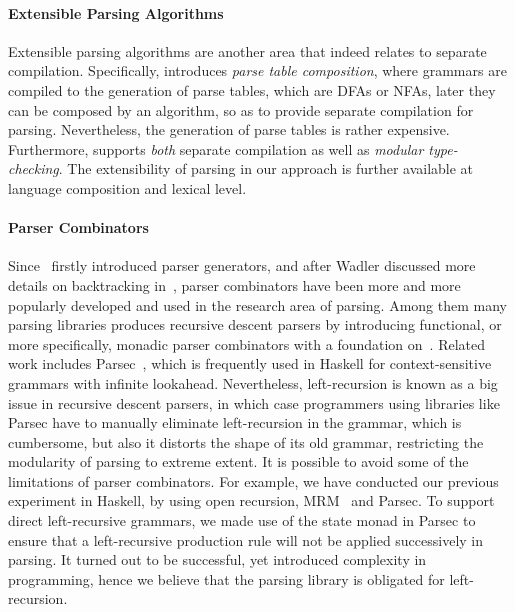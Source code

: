 \paragraph{Extensible Parsing Algorithms}
Extensible parsing algorithms are another area that indeed relates to
separate compilation. Specifically, \cite{Bravenboer2009} introduces
\textit{parse table composition}, where grammars are compiled
to the generation of parse tables, which are DFAs or NFAs, later they
can be composed by an algorithm, so as to provide separate compilation
for parsing. Nevertheless, the generation of parse tables is rather
expensive.
Furthermore, \name supports \emph{both} separate compilation
as well as \emph{modular type-checking}. The extensibility of
parsing in our approach is further available at language composition
and lexical level. 

\paragraph{Parser Combinators} Since~\cite{burge1975} firstly
introduced parser generators, and after Wadler discussed more details
on backtracking in~\cite{Wadler1985}, parser combinators have been
more and more popularly developed and used in the research area of
parsing. Among them many parsing libraries produces recursive descent
parsers by introducing functional, or more specifically, monadic
parser combinators with a foundation on~\cite{nott237}. Related work
includes Parsec~\cite{Leijen2001}, which is frequently used in Haskell
for context-sensitive grammars with infinite lookahead. Nevertheless,
left-recursion is known as a big issue in recursive descent parsers,
in which case programmers using libraries like Parsec have to manually
eliminate left-recursion in the grammar, which is cumbersome, but also
it distorts the shape of its old grammar, restricting the modularity
of parsing to extreme extent. It is possible to avoid some of
 the limitations of parser combinators.
For example, we have
conducted our previous experiment in Haskell, by using open recursion,
MRM~\cite{Oliveira2015} and Parsec. To support direct left-recursive
grammars, we made use of the state monad in Parsec to ensure that a
left-recursive production rule will not be applied successively in
parsing. It turned out to be successful, yet introduced complexity in
programming, hence we believe that the parsing library is obligated
for left-recursion.

